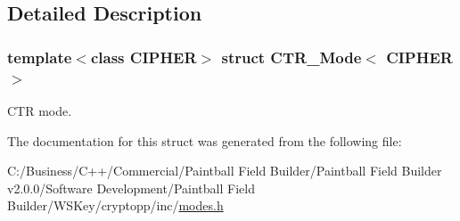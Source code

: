 \subsection{Detailed Description}
\subsubsection*{template$<$class CIPHER$>$ struct CTR\_\-Mode$<$ CIPHER $>$}

CTR mode. 

The documentation for this struct was generated from the following file:\begin{DoxyCompactItemize}
\item 
C:/Business/C++/Commercial/Paintball Field Builder/Paintball Field Builder v2.0.0/Software Development/Paintball Field Builder/WSKey/cryptopp/inc/\hyperlink{modes_8h}{modes.h}\end{DoxyCompactItemize}
